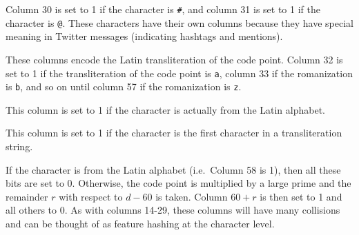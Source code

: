 \documentclass[sigconf,10pt]{acmart}
\newcommand{\str}[1]{\texttt{#1}}
\begin{document}
\begin{description}
\begin{description}[font=\normalfont\itshape]
\item[Columns 30-31:]
    Column 30 is set to 1 if the character is \str{\#},
    and column 31 is set to 1 if the character is \str{@}.
    These characters have their own columns because they have special meaning in Twitter messages
    (indicating hashtags and mentions).

\item[Columns 32-57:]
    These columns encode the Latin transliteration of the code point.
    Column 32 is set to 1 if the transliteration of the code point is \str{a},
    column 33 if the romanization is \str{b},
    and so on until column 57 if the romanization is \str{z}.

\item[Column 58:]
    This column is set to 1 if the character is actually from the Latin alphabet.

\item[Column 59:]
    This column is set to 1 if the character is the first character in a transliteration string.

\item[Columns 60-$d$:]
    If the character is from the Latin alphabet (i.e.\ Column 58 is 1), 
    then all these bits are set to 0.
    Otherwise, the code point is multiplied by a large prime and the remainder $r$ with respect to $d-60$ is taken.
    Column $60+r$ is then set to 1 and all others to 0.
    As with columns 14-29,
    these columns will have many collisions and can be thought of as feature hashing \citep{weinberger2009feature} at the character level.
\end{description}


\end{description}
\end{document}
